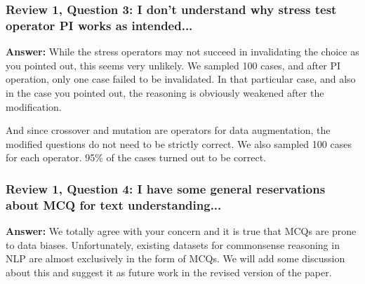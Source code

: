 \documentclass{article}
\begin{document}

\subsubsection*{Review 1, Question 3: I don't understand why stress test operator PI works as intended...}

\textbf{Answer:} While the stress operators may not succeed in invalidating
the choice as you pointed out, this seems very unlikely. We sampled 
100 cases, and after PI operation, only one case failed to be invalidated.
In that particular case, and also in the case you pointed out, 
the reasoning is obviously weakened after the modification. 

And since crossover and mutation are operators for data augmentation, 
the modified questions do not need to be strictly correct. 
We also sampled 100 cases for each operator. 95\% of the cases turned out
to be correct. 
%

\subsubsection*{Review 1, Question 4: I have some general reservations about MCQ for text understanding...}

\textbf{Answer:} 
We totally agree with your concern and it is true that MCQs are prone to
data biases. Unfortunately, existing datasets for commonsense reasoning in NLP 
are almost exclusively in the form of MCQs. We will add some discussion
about this and suggest it as future work in the revised version of the paper.
\end{document}
